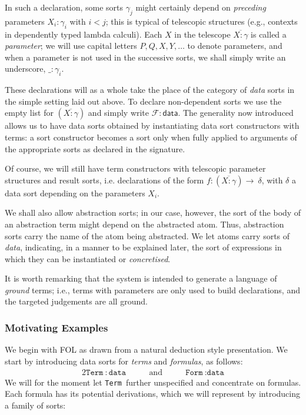 \documentclass[11pt,a4paper]{amsart}
\newcounter{s}
\newcommand{\vect}[1]{\ensuremath{\overline{#1}}}
\newcommand{\depconstrdecl}[3]{\ensuremath{#1 : (#2) \rightarrow\ #3}}
\newcommand{\typing}[2]{\ensuremath{#1 : #2}}
\newcommand{\data}{\ensuremath{\mathsf{data}}}
\newcommand{\Trm}{\texttt{Term}}
\newcommand{\Frm}{\texttt{Form}}
\newcommand{\dta}{\texttt{data}}
\begin{document}
In such a declaration, some sorts $\gamma_j$ might certainly depend on \textit{preceding} parameters $\typing{X_i}{\gamma_i}$ with $i < j$; this is typical of telescopic structures (e.g., contexts in dependently typed lambda calculi). 
Each $X$ in the telescope $\vect{\typing{X}{\gamma}}$ is called a \emph{parameter}; we will use  capital letters $P,Q,X,Y,\ldots$ to denote parameters, and when a parameter is not used in the successive sorts, we shall simply write an underscore, $\typing{\_}{\gamma_i}$.

These
declarations will as a whole take the place of the category of \emph{data} sorts
in the simple setting laid out above.
To declare non-dependent sorts we use the empty list for
$(\vect{\typing{X}{\gamma}})$ and simply write  $\typing{\mathcal{F}}{\data}$.
The generality now introduced allows us to have data sorts obtained by instantiating 
data sort constructors with terms: a sort constructor becomes a sort only when
fully applied to arguments of the appropriate sorts as declared in the signature.


Of course, we will still have term constructors with telescopic parameter structures and result sorts, i.e. declarations of the form \depconstrdecl{f}{\vect{\typing{X}{\gamma}}}{\delta},
with $\delta$ a data sort depending on the parameters $X_i$.

We shall also allow abstraction sorts; in our case, however, the sort of the body of 
an abstraction term might depend on the abstracted atom. Thus, abstraction sorts carry
the name of the atom being abstracted. 
We let atoms carry sorts of \emph{data}, indicating, in a manner to be explained later, the sort of expressions in which they can be instantiated or \emph{concretised}.

It is worth remarking that the system is intended to generate a language of \emph{ground} terms; i.e., terms with parameters are only used to build declarations, and the targeted judgements are all ground. 

\subsubsection*{Motivating Examples}
\label{sec:motee}
We begin with FOL as drawn from a natural deduction
style presentation.
\noindent We start by introducing data sorts for \emph{terms} and \emph{formulas}, as follows:
\begin{alignat*}{2}
    \Trm~: \dta & \qquad \text{and} \qquad &
  \Frm~: \dta
\end{alignat*}
We will for the moment let \Trm\ further unspecified and concentrate on formulas. Each formula has its potential derivations, which we will represent by introducing a family of sorts:
\end{document}

